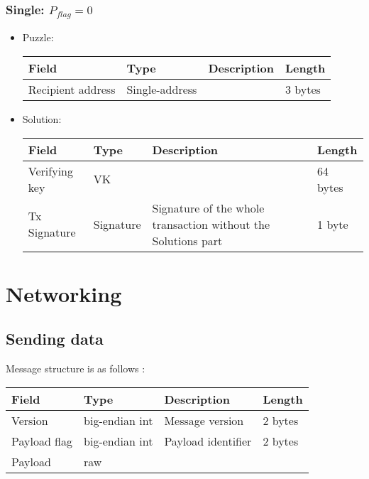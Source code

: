 \documentclass[a4paper,10pt]{article}
\begin{document}
            \subsubsection{Single: $P_{flag} = 0$}
                \begin{itemize}
                 \item Puzzle:\\
                    
                    \begin{tabularx}{\textwidth}{|l|l|X|l|}
                        \hline Field & Type & Description & Length \\ \hline
                        \hline Recipient address & Single-address &  & 3 bytes \\
                        \hline
                    \end{tabularx}
                 \item Solution:\\
                 
                    \begin{tabularx}{\textwidth}{|l|l|X|l|}
                        \hline Field & Type & Description & Length \\ \hline
                        \hline Verifying key & VK &  & 64 bytes \\
                        \hline Tx Signature & Signature & Signature of the whole transaction without the Solutions part & 1 byte \\
                        \hline
                    \end{tabularx}
                \end{itemize}

                

    \section{Networking}
        \subsection{Sending data}
            Message structure is as follows :\\
            \begin{tabularx}{\textwidth}{|l|l|X|l|}
                \hline Field & Type & Description & Length \\ \hline
                \hline Version & big-endian int & Message version & 2 bytes \\
                \hline Payload flag & big-endian int & Payload identifier & 2 bytes \\
                \hline Payload & raw &  & \\
                \hline
            \end{tabularx}
\end{document}
